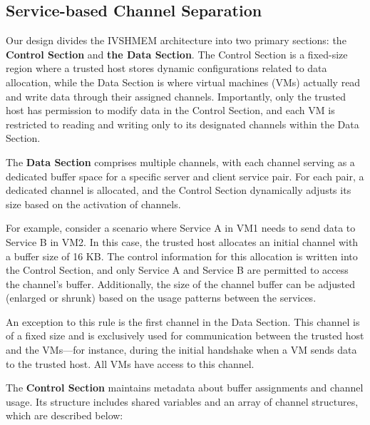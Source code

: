 \documentclass[conference]{IEEEtran}
\begin{document}
\subsection{Service-based Channel Separation}

Our design divides the IVSHMEM architecture into two primary sections: the \textbf{Control Section} and \textbf{the Data Section}. The Control Section is a fixed-size region where a trusted host stores dynamic configurations related to data allocation, while the Data Section is where virtual machines (VMs) actually read and write data through their assigned channels. Importantly, only the trusted host has permission to modify data in the Control Section, and each VM is restricted to reading and writing only to its designated channels within the Data Section.


The \textbf{Data Section} comprises multiple channels, with each channel serving as a dedicated buffer space for a specific server and client service pair. For each pair, a dedicated channel is allocated, and the Control Section dynamically adjusts its size based on the activation of channels.

For example, consider a scenario where Service A in VM1 needs to send data to Service B in VM2. In this case, the trusted host allocates an initial channel with a buffer size of 16 KB. The control information for this allocation is written into the Control Section, and only Service A and Service B are permitted to access the channel’s buffer. Additionally, the size of the channel buffer can be adjusted (enlarged or shrunk) based on the usage patterns between the services.

An exception to this rule is the first channel in the Data Section. This channel is of a fixed size and is exclusively used for communication between the trusted host and the VMs—for instance, during the initial handshake when a VM sends data to the trusted host. All VMs have access to this channel.


The \textbf{Control Section} maintains metadata about buffer assignments and channel usage. Its structure includes shared variables and an array of channel structures, which are described below:
\end{document}

